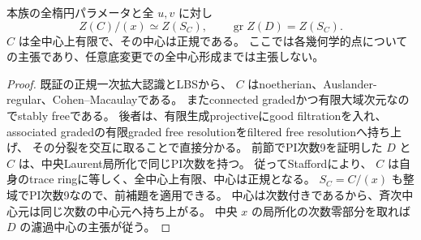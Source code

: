 \begin{theorem}
\label{thm:cubic-third-root-unit-boundary-L-trace-center}
本族の全楕円パラメータと全 $u,v$ に対し
\[
 Z(C)/(x)\simeq Z(S_C),\qquad
 \operatorname{gr} Z(D)=Z(S_C).
\]
$C$ は全中心上有限で、その中心は正規である。
ここでは各幾何学的点についての主張であり、任意底変更での全中心形成までは主張しない。
\end{theorem}
\begin{proof}
既証の正規一次拡大認識とLBS\cite[Corollaries~2.3, 2.7]{LBS}から、
$C$ はnoetherian、Auslander-regular、Cohen--Macaulayである。
またconnected gradedかつ有限大域次元なのでstably freeである。
後者は、有限生成projectiveにgood filtrationを入れ、
associated gradedの有限graded free resolutionをfiltered free resolutionへ持ち上げ、
その分裂を交互に取ることで直接分かる。
前節でPI次数9を証明した $D$ と $C$ は、中央Laurent局所化で同じPI次数を持つ。
従ってStafford\cite[Theorem~2.10, Corollary~2.11]{StaffordMaxOrders}により、
$C$ は自身のtrace ringに等しく、全中心上有限、中心は正規となる。
$S_C=C/(x)$ も整域でPI次数9なので、前補題を適用できる。
中心は次数付きであるから、斉次中心元は同じ次数の中心元へ持ち上がる。
中央 $x$ の局所化の次数零部分を取れば $D$ の濾過中心の主張が従う。
\end{proof}
